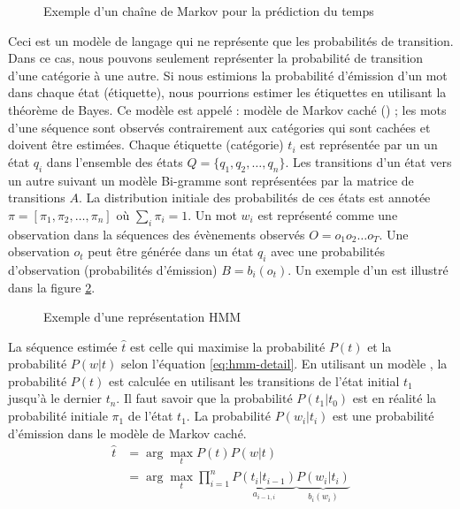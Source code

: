 \documentclass{KodeBook}
\begin{document}
\begin{figure}[ht]
	\centering
	\caption[Exemple d'un chaîne de Markov pour la prédiction du temps]{Exemple d'un chaîne de Markov pour la prédiction du temps \cite{2019-jurafsky-martin}\label{fig:cm-exp}}
\end{figure}

Ceci est un modèle de langage qui ne représente que les probabilités de transition. 
Dans ce cas, nous pouvons seulement représenter la probabilité de transition d'une catégorie à une autre. 
Si nous estimions la probabilité d'émission d'un mot dans chaque état (étiquette), nous pourrions estimer les étiquettes en utilisant la  théorème de Bayes. 
Ce modèle est appelé : modèle de Markov caché () ; les mots d'une séquence sont observés contrairement aux catégories qui sont cachées et doivent être estimées. 
Chaque étiquette (catégorie) $t_i$ est représentée par un un état $q_i$ dans l'ensemble des états $Q = \{q_1, q_2, \ldots, q_n\}$.
Les transitions d'un état vers un autre suivant un modèle Bi-gramme sont représentées par la matrice de transitions $A$.
La distribution initiale des probabilités de ces états est annotée $\pi = [\pi_1, \pi_2, \ldots, \pi_n ]$ où $\sum_i \pi_i = 1$.
Un mot $w_i$ est représenté comme une observation dans la séquences des évènements observés $O = o_1 o_2 \ldots o_T$. 
Une observation $o_t$ peut être générée dans un état $q_i$ avec une probabilités d'observation (probabilités d'émission) $B = b_i(o_t)$.
Un exemple d'un  est illustré dans la figure \ref{fig:hmm-exp}. 
\begin{figure}[ht]
	\centering
	\caption[Exemple d'une représentation HMM]{Exemple d'une représentation HMM \cite{2019-jurafsky-martin}\label{fig:hmm-exp}}
\end{figure}

La séquence estimée $\hat{t}$ est celle qui maximise la probabilité $P(t)$ et la probabilité $P(w | t)$ selon l'équation \ref{eq:hmm-detail}.
En utilisant un modèle , la probabilité $P(t)$ est calculée en utilisant les transitions de l'état initial $t_1$ jusqu'à le dernier $t_n$. 
Il faut savoir que la probabilité $P(t_1|t_0)$ est en réalité la probabilité initiale $\pi_1$ de l'état $t_1$.
La probabilité $P(w_i | t_i)$ est une probabilité d'émission dans le modèle de Markov caché.
\begin{align}
\hat{t} & = \arg\max\limits_t P(t) P(w | t) \nonumber\\
        & = \arg\max\limits_t \prod_{i=1}^{n} \underbrace{P(t_i|t_{i-1})}_{a_{i-1,i}} \underbrace{P(w_i | t_i)}_{b_i(w_i)} \label{eq:hmm-detail}
\end{align}
\end{document}
